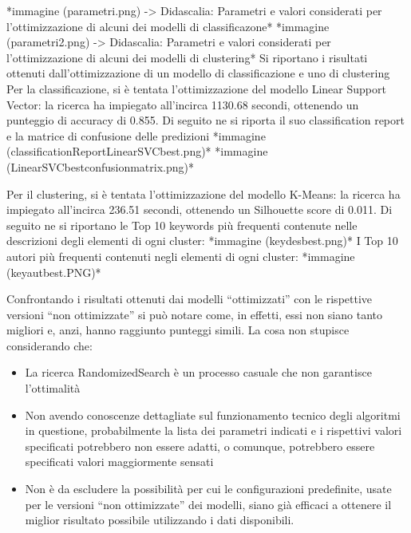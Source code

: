 \documentclass[12pt,oneside]{article}
\begin{document}
\begin{justify}
        *immagine (parametri.png) -> Didascalia: Parametri e valori considerati per l’ottimizzazione di alcuni dei modelli di classificazone*
        *immagine (parametri2.png) -> Didascalia: Parametri e valori considerati per l’ottimizzazione di alcuni dei modelli di clustering*
        Si riportano i risultati ottenuti dall’ottimizzazione di un modello di classificazione e uno di clustering
        Per la classificazione, si è tentata l’ottimizzazione del modello Linear Support Vector: la ricerca ha impiegato all’incirca 1130.68 secondi, ottenendo un punteggio di accuracy di 0.855. Di seguito ne si riporta il suo classification report e la matrice di confusione delle predizioni
        *immagine (classificationReportLinearSVCbest.png)*
        *immagine (LinearSVCbestconfusionmatrix.png)*
        
        Per il clustering, si è tentata l’ottimizzazione del modello K-Means: la ricerca ha impiegato all’incirca 236.51 secondi, ottenendo un Silhouette score di 0.011. Di seguito ne si riportano le Top 10 keywords più frequenti contenute nelle descrizioni degli elementi di ogni cluster:
        *immagine (keydesbest.png)*
        I Top 10 autori più frequenti contenuti negli elementi di ogni cluster:
        *immagine (keyautbest.PNG)*
        
        Confrontando i risultati ottenuti dai modelli “ottimizzati” con le rispettive versioni “non ottimizzate” si può notare come, in effetti, essi non siano tanto migliori e, anzi, hanno raggiunto punteggi simili. La cosa non stupisce considerando che: 
        \begin{itemize}
            \item La ricerca RandomizedSearch è un processo casuale che non garantisce l’ottimalità
            \item Non avendo conoscenze dettagliate sul funzionamento tecnico degli algoritmi in questione, probabilmente la lista dei parametri indicati e i rispettivi valori specificati potrebbero non essere adatti, o comunque, potrebbero essere specificati valori maggiormente sensati
            \item Non è da escludere la possibilità per cui le configurazioni predefinite, usate per le versioni “non ottimizzate” dei modelli, siano già efficaci a ottenere il miglior risultato possibile utilizzando i dati disponibili.
        \end{itemize}
    \end{justify}
\end{document}
